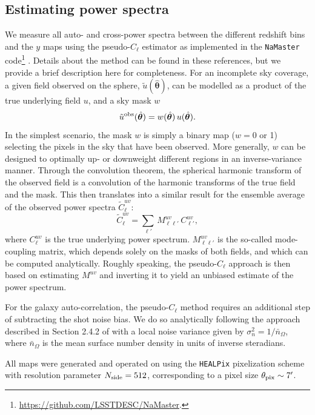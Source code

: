 \documentclass[useAMS,usenatbib]{mn2e}
\newcommand{\nv}{\hat{\boldsymbol{\theta}}}
\begin{document}
  \subsection{Estimating power spectra}\label{ssec:methods.cls}
    We measure all auto- and cross-power spectra between the different redshift bins and the $y$ maps using the pseudo-$C_\ell$ estimator \citep[e.g.][]{2002ApJ...567....2H} as implemented in the {\tt NaMaster} code\footnote{\url{https://github.com/LSSTDESC/NaMaster}.} \citep{2019MNRAS.484.4127A}. Details about the method can be found in these references, but we provide a brief description here for completeness. For an incomplete sky coverage, a given field observed on the sphere, $\tilde{u}(\nv)$, can be modelled as a product of the true underlying field $u$, and a sky mask $w$
    \begin{equation}
      \tilde{u}^{\rm obs}(\nv) = w(\nv)\,u(\nv).
    \end{equation}
    In the simplest scenario, the mask $w$ is simply a binary map ($w=0$ or 1) selecting the pixels in the sky that have been observed. More generally, $w$ can be designed to optimally up- or downweight different regions in an inverse-variance manner. Through the convolution theorem, the spherical harmonic transform of the observed field is a convolution of the harmonic transforms of the true field and the mask. This then translates into a similar result for the ensemble average of the observed power spectra $\tilde{C}^{uv}_\ell$:
    \begin{equation}
      \tilde{C}^{uv}_\ell = \sum_{\ell'}\,M^{uv}_{\ell \ell'}\, C^{uv}_{\ell'},
    \end{equation}
    where $C^{uv}_\ell$ is the true underlying power spectrum. $M^{uv}_{\ell \ell'}$ is the so-called mode-coupling matrix, which depends solely on the masks of both fields, and which can be computed analytically. Roughly speaking, the pseudo-$C_\ell$ approach is then based on estimating $M^{uv}$ and inverting it to yield an unbiased estimate of the power spectrum.
    
    For the galaxy auto-correlation, the pseudo-$C_\ell$ method requires an additional step of subtracting the shot noise bias. We do so analytically following the approach described in Section 2.4.2 of \cite{2019MNRAS.484.4127A} with a local noise variance given by $\sigma_n^2=1/\bar{n}_\Omega$, where $\bar{n}_\Omega$ is the mean surface number density in units of inverse steradians.
    
    All maps were generated and operated on using the {\tt HEALPix} pixelization scheme \citep{2005ApJ...622..759G} with resolution parameter $N_{\rm side}=512$, corresponding to a pixel size $\theta_{\rm pix}\sim7'$.
\end{document}
